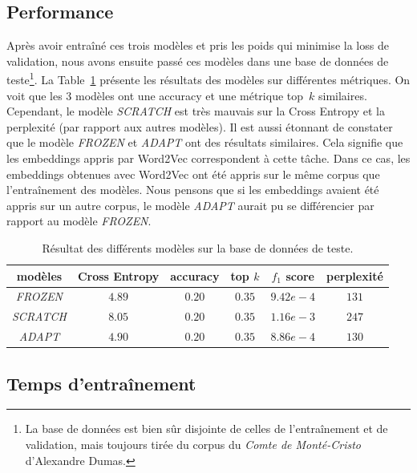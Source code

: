 \documentclass[a4paper]{article}
\begin{document}
\subsection{Performance}

Après avoir entraîné ces trois modèles et pris les poids qui minimise la loss de validation, nous avons ensuite passé ces modèles dans 
une base de données de teste\footnote{La base de données est bien sûr disjointe de celles de l'entraînement et de validation, mais toujours
tirée du corpus du \textit{Comte de Monté-Cristo} d'Alexandre  Dumas.}. La Table~\ref{tab:test} présente les résultats des modèles sur 
différentes métriques. On voit que les 3 modèles ont une accuracy et une métrique top~$k$ similaires. Cependant, le modèle \textit{SCRATCH} 
est très mauvais sur la Cross Entropy et la perplexité (par rapport aux autres modèles). Il est aussi étonnant de constater que le modèle
\textit{FROZEN} et \textit{ADAPT} ont des résultats similaires. Cela signifie que les embeddings appris par Word2Vec correspondent à cette tâche.
Dans ce cas, les embeddings obtenues avec Word2Vec ont été appris sur le même corpus que l'entraînement des modèles. Nous pensons que si 
les embeddings avaient été appris sur un autre corpus, le modèle \textit{ADAPT} aurait  pu se différencier par rapport au modèle \textit{FROZEN}.


\begin{table}[ht]
    \centering
    \begin{tabular}{|c|c|c|c|c|c|}
        \hline
        modèles & Cross Entropy & accuracy & top $k$ & $f_1$ score & perplexité \\
        \hline
        \textit{FROZEN} & $4.89$ &  $0.20$ & $0.35$ & $9.42e-4$ & $131$ \\
        \textit{SCRATCH} & $8.05$ &  $0.20$ & $0.35$ & $1.16e-3$ & $247$ \\
        \textit{ADAPT} & $4.90$ &  $0.20$ & $0.35$ & $8.86e-4$ & $130$ \\
        \hline
    \end{tabular}
    \caption{Résultat des différents modèles sur la base de données de teste.}
    \label{tab:test}
\end{table}

\subsection{Temps d'entraînement}
\end{document}
